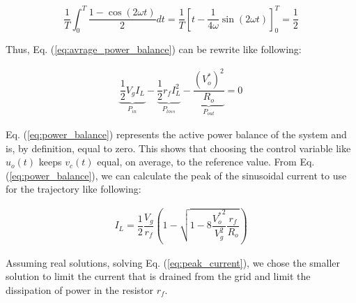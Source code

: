 \documentclass[DIV=calc, paper=a4, fontsize=11pt, twocolumn]{scrartcl}	 %
\begin{document}
\begin{equation}\label{eq:integral cos}
\frac{1}{T}\int_{0}^T{\dfrac{1-\cos(2\omega t)}{2} dt} = \frac{1}{T}\left[ t -\frac{1}{4\omega} \sin(2\omega t) \right]_{0}^{T}= \frac{1}{2}
\end{equation}

Thus, Eq. (\ref{eq:avrage_power_balance}) can be rewrite like following:

\begin{align}\label{eq:power_balance}
 \underbrace{\dfrac{1}{2}V_g I_L}_{P_{in}} - \underbrace{\dfrac{1}{2}r_f I_L^2}_{P_{loss}} - \underbrace{\dfrac{(V^*_{o})^2 }{R_o}}_{P_{out}} = 0 
\end{align}

Eq. (\ref{eq:power_balance}) represents the active power balance of the system and is, by definition, equal to zero. This shows that choosing the control variable like $u_o(t)$ keeps $v_c(t)$ equal, on average, to the reference value. 
From Eq. (\ref{eq:power_balance}), we can calculate the peak of the sinusoidal current to use for the trajectory like following:

\begin{align} \label{eq:peak_current}
I_L= \dfrac{1}{2}\dfrac{V_g}{r_f}\left(1-\sqrt{1-8\dfrac{{V^*_{o}}^2}{V_g^2}\dfrac{r_f}{R_o}}\right)
\end{align}

Assuming real solutions, solving Eq. (\ref{eq:peak_current}), we chose the smaller solution to limit the current that is drained from the grid and limit the dissipation of power in the resistor $r_f$.
\end{document}
